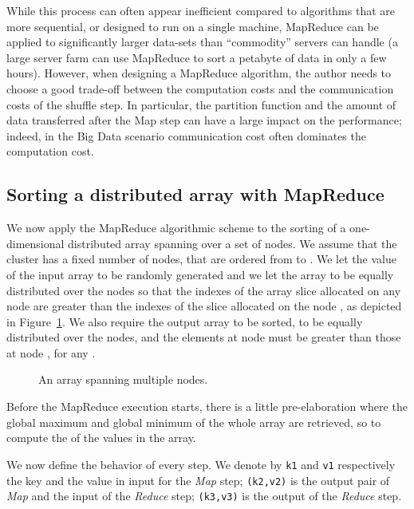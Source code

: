 \documentclass[a4paper]{article}
\numberwithin{equation}{section}
\begin{document}
While this process can often appear
inefficient compared to algorithms that are more sequential, or
designed to run on a single machine, MapReduce can be applied to
significantly larger data-sets than ``commodity'' servers can handle (a
large server farm can use MapReduce to sort a petabyte of data in only
a few hours\cite{petasort}). 
However,
 when designing a MapReduce algorithm, the author needs to choose a
good trade-off\cite{Ullman:2012:DGM:2331042.2331053} between the
computation costs and the communication costs of the shuffle
step. In particular, the partition function and the amount of data
transferred after the Map step can have a large impact on the
performance; indeed, in the Big Data scenario communication cost often
dominates the computation cost. 


\subsection{Sorting a distributed array with MapReduce}

We now apply the MapReduce algorithmic scheme to the sorting of
a one-dimensional distributed array spanning over a set of nodes. 
We assume that the cluster has a fixed number of  nodes, that are
ordered from  to . We let the value of the input array to be randomly generated 
and we let the array to be equally distributed over the nodes so that
the indexes of the array slice 
allocated on any node  are greater than the indexes of the slice allocated on the node , as
depicted in Figure~\ref{fig:distributedArray}.
We also require the output array to be sorted, to be equally
distributed over the nodes, and the elements at node  must be
greater than those at node , for any . 

 \begin{figure}[ht]
 	\centering
 	\caption{An array spanning multiple nodes.}
 	\label{fig:distributedArray}
 \end{figure}


Before the MapReduce execution starts, there is a little
pre-elaboration where the global maximum and global minimum of the
whole array are retrieved, so to compute the  of the
values in the array.

We now define the behavior of every step. We denote by
\verb+k1+ and \verb+v1+ respectively the key and the value in input
for the \textit{Map} step; \verb+(k2,v2)+ is the output pair of
\textit{Map} and the input of the \textit{Reduce} step;
\verb+(k3,v3)+ is the output of the \textit{Reduce} step. 
\end{document}
